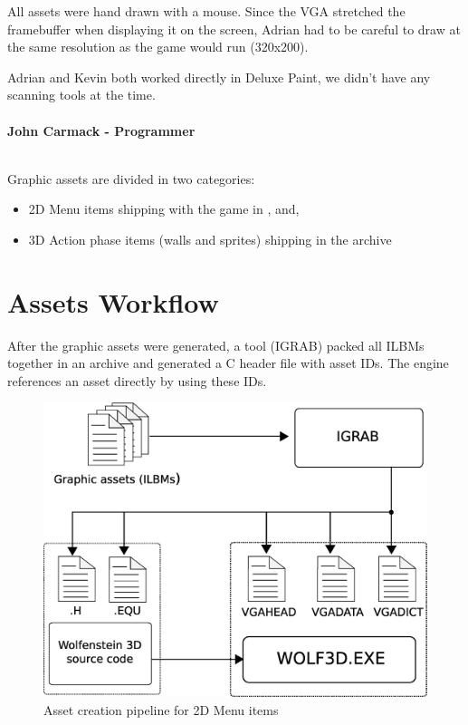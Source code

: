 \documentclass[book.tex]{subfiles}
\begin{document}
All assets were hand drawn with a mouse. Since the VGA stretched the framebuffer when displaying it on the screen, Adrian had to be careful to draw at the same resolution as the game would run (320x200).\\
\par
\begin{fancyquotes}
Adrian and Kevin both worked directly in Deluxe Paint, we didn't have any scanning tools at the time.\\
\\
\textbf{John Carmack - Programmer}
\end{fancyquotes}
\\
Graphic assets are divided in two categories:
\begin{itemize}
\item 2D Menu items shipping with the game in ,  and, 
\item 3D Action phase items (walls and sprites) shipping in the  archive
\end{itemize}















\section{Assets Workflow}
After the graphic assets were generated, a tool (IGRAB) packed all ILBMs together in an archive and generated a C header file with asset IDs. The engine references an asset directly by using these IDs.\\
\begin{figure}[H]
\centering
 \includegraphics[width=.9\textwidth]{imgs/drawings/drawing_plain.eps}
 \caption{Asset creation pipeline for 2D Menu items}
 \label{asset-creation-pipeline}
\end{figure}
\par
\begin{minipage}{\textwidth}
 \par
 \end{minipage}
 
\end{document}
